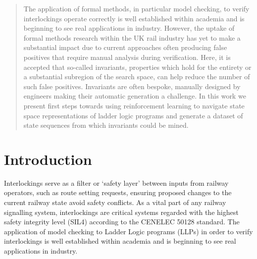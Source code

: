 \documentclass[conference,compsoc]{IEEEtran}
\begin{document}
\listoftodos


\maketitle


\begin{abstract}
The application of formal methods, in particular model checking, to verify interlockings operate correctly is well established within academia and is beginning to see real applications in industry. However, the uptake of formal methods research within the UK rail industry has yet to make a substantial impact due to current approaches often producing false positives that require manual analysis during verification. Here, it is accepted that so-called invariants, properties which hold for the entirety or a substantial subregion of the search space, can help reduce the number of such false positives. Invariants are often bespoke, manually designed by engineers making their automatic generation a challenge. In this work we present first steps towards using reinforcement learning to navigate state space representations of ladder logic programs and generate a dataset of state sequences from which invariants could be mined.
\end{abstract}



%
\IEEEpeerreviewmaketitle



\section{Introduction}

Interlockings serve as a filter or ‘safety layer’ between inputs from railway operators, such as route setting requests, ensuring proposed changes to the current railway state avoid safety conflicts. As a vital part of any railway signalling system, interlockings are critical systems regarded with the highest safety integrity level
(SIL4) according to the CENELEC 50128 standard. The application of model checking
to Ladder Logic programs (LLPs) in order to verify interlockings is well established within
academia and is beginning to see real applications in industry.  
\end{document}
